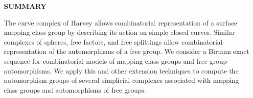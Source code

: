 \clearpage
\begin{centering}
\textbf{SUMMARY}\\
\vspace{\baselineskip}
\end{centering}

The curve complex of Harvey allows combinatorial representation of a surface
mapping class group by describing its action on simple closed curves.
Similar complexes of spheres, free factors, and free splittings allow
combinatorial representation of the automorphisms of a free group.
We consider a Birman exact sequence for combinatorial models of
mapping class groups and free group automorphisms.
We apply this and other extension techniques to compute the
automorphism groups of several simplicial complexes associated
with mapping class groups and automorphisms of free groups.

